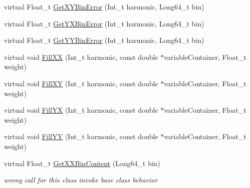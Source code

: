 \begin{DoxyCompactItemize}
\item 
virtual Float\+\_\+t \mbox{\hyperlink{classQn_1_1CorrectionProfileCorrelationComponentsHarmonics_ac3aada46be56f35fa487ed621889b121}{Get\+X\+Y\+Bin\+Error}} (Int\+\_\+t harmonic, Long64\+\_\+t bin)
\item 
virtual Float\+\_\+t \mbox{\hyperlink{classQn_1_1CorrectionProfileCorrelationComponentsHarmonics_a27ddadf86598339c7cc6bbdc8f5475fe}{Get\+Y\+X\+Bin\+Error}} (Int\+\_\+t harmonic, Long64\+\_\+t bin)
\item 
virtual Float\+\_\+t \mbox{\hyperlink{classQn_1_1CorrectionProfileCorrelationComponentsHarmonics_a66b580c99a004f475f612b0835ff9da1}{Get\+Y\+Y\+Bin\+Error}} (Int\+\_\+t harmonic, Long64\+\_\+t bin)
\item 
virtual void \mbox{\hyperlink{classQn_1_1CorrectionProfileCorrelationComponentsHarmonics_a6f62753a3c19725bca87c408b4ba62a9}{Fill\+XX}} (Int\+\_\+t harmonic, const double $\ast$variable\+Container, Float\+\_\+t weight)
\item 
virtual void \mbox{\hyperlink{classQn_1_1CorrectionProfileCorrelationComponentsHarmonics_a2ab0d7bd1188858fb1953812d2732e7e}{Fill\+XY}} (Int\+\_\+t harmonic, const double $\ast$variable\+Container, Float\+\_\+t weight)
\item 
virtual void \mbox{\hyperlink{classQn_1_1CorrectionProfileCorrelationComponentsHarmonics_a233a81523a12204f57104edcacd0bf31}{Fill\+YX}} (Int\+\_\+t harmonic, const double $\ast$variable\+Container, Float\+\_\+t weight)
\item 
virtual void \mbox{\hyperlink{classQn_1_1CorrectionProfileCorrelationComponentsHarmonics_a3bb3424e5ff93d56e925f0b60a57a90c}{Fill\+YY}} (Int\+\_\+t harmonic, const double $\ast$variable\+Container, Float\+\_\+t weight)
\item 
\mbox{\label{classQn_1_1CorrectionProfileCorrelationComponentsHarmonics_a4002be74c4146565fa0f93789b739463}} 
virtual Float\+\_\+t \mbox{\hyperlink{classQn_1_1CorrectionProfileCorrelationComponentsHarmonics_a4002be74c4146565fa0f93789b739463}{Get\+X\+X\+Bin\+Content}} (Long64\+\_\+t bin)
\begin{DoxyCompactList}\small\item\em wrong call for this class invoke base class behavior \end{DoxyCompactList}\item 
\mbox{\label{classQn_1_1CorrectionProfileCorrelationComponentsHarmonics_a41d1dce57a2eab50abf2a02aaf7cce1e}} 

\end{DoxyCompactItemize}

